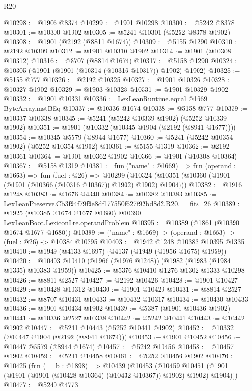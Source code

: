 \begin{lexlean}{R20}
\begin{coremodule}
@10298 := @1906 @8374
@10299 := @1901 @10298
@10300 := @5242 @8378
@10301 := @10300 @1902
@10305 := @5241 @10301 (@5252 @8378 @1902)
@10308 := @1901 (@2192 (@8811 @1674))
@10309 := @5155 @1290
@10310 := @2192 @10309
@10312 := @1901 @10310 @1902
@10314 := @1901 (@10308 @10312)
@10316 := @8707 (@8814 @1674)
@10317 := @5158 @1290
@10324 := @10305 (@1901 (@1901 (@10314 (@10316 @10317)) @1902) @1902)
@10325 := @5155 @777
@10326 := @2192 @10325
@10327 := @1901 @10326
@10328 := @10327 @1902
@10329 := @1903 @10328
@10331 := @1901 @10329 @1902
@10332 := @1901 @10331
@10336 := LexLeanRuntime.equal @1669 ByteArray.instBEq
@10337 := @10336 @1674
@10338 := @5158 @777
@10339 := @10337 @10338
@10345 := @5241 (@5242 @10339 @1902) (@5252 @10339 @1902)
@10351 := @1901 (@10332 (@10345 @1904 (@2192 (@8941 @1677))))
@10354 := @10345 @5579 (@8944 @1677)
@10360 := @5241 (@5242 @10354 @1902) (@5252 @10354 @1902)
@10361 := @5155 @1319
@10362 := @2192 @10361
@10364 := @1901 @10362 @1902
@10366 := @1901 (@10308 @10364)
@10367 := @5158 @1319
@10381 := fun ("name" : @1669) =>
  fun (operand : @1663) =>
  fun (fuel : @26) =>
  @10299 (@10324 (@10351 (@10360 (@1901 (@1901 (@10366 (@10316 @10367)) @1902) @1902) @1904)))
@10382 := @1916 @1248
@10383 := @1676 @4340
@10384 := @10382 @10383
@10385 := LexLeanPreserve.Cb3f94f79f9e8df177550f627f92bd8d2.R20.__fits_26
@10389 := @1925 (@10385 @1674 @1677 @1680)
@10390 := LexLeanBoot.LexiconLre.operandProblem
@10395 := @10389 (@1861 (@10390 @1674 @1677 @1680))
@10399 := ("name" : @1669) -> (operand : @1663) -> (fuel : @26) -> @10384 @10395
@10403 := @1942 @1248 @10383 @10395 @1335
@10410 := @1949 (@4133 @1697) (@4137 (@1949 (@1956 @1675) @1959))
@10420 := @10403 @10410 (@1966 (@1976 @1248)) (@1982 (@1983 (@1984 @1335) @10383 @1959))
@10425 := @5376 @10410 @1276 @1302 @1333 @10298
@10426 := @8811 @2527
@10427 := @2192 @10426
@10428 := @1901 @10427
@10429 := @10428 @10312
@10430 := @1901 @10429
@10431 := @8814 @2527
@10432 := @8707 @10431
@10433 := @10432 @10317
@10434 := @10430 @10433
@10436 := @1901 @10434 @1902
@10439 := @5387 (@1901 @10436 @1902)
@10441 := @10336 @2527 @10338
@10442 := @5242 @10441
@10443 := @10442 @1902
@10447 := @5241 @10443 (@5252 @10441 @1902)
@10452 := @10332 (@10447 @1904 (@2192 (@8941 @1674)))
@10453 := @1901 @10452
@10456 := @10447 @5579 (@8944 @1674)
@10457 := @5242 @10456
@10458 := @10457 @1902
@10459 := @5241 @10458
@10461 := @5252 @10456 @1902
@10476 := @10425
    (fun (__b : @1898) =>
    @10439
      (@10453
        (@10459 @10461 (@1901 (@1901 (@1901 (@10428 @10364) (@10432 @10367)) @1902) @1902) @1904)))
@10477 := @5240 @4773

\end{coremodule}
\end{lexlean}
